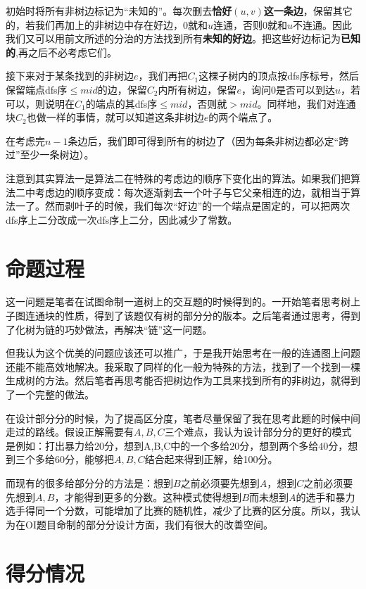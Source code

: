 \documentclass{noithesis}
\begin{document}
初始时将所有非树边标记为“未知的”。每次删去\textbf{恰好$(u, v)$这一条边}，保留其它的，若我们再加上的非树边中存在好边，$0$就和$u$连通，否则$0$就和$u$不连通。因此我们又可以用前文所述的分治的方法找到所有\textbf{未知的好边}。把这些好边标记为\textbf{已知的},再之后不必考虑它们。

接下来对于某条找到的非树边$e$，我们再把$C_1$这棵子树内的顶点按dfs序标号，然后保留端点dfs序$\leq mid$的边，保留$C_2$内所有树边，保留$e$，询问$0$是否可以到达$u$，若可以，则说明在$C_1$的端点的其dfs序$\leq mid$，否则就$> mid$。同样地，我们对连通块$C_2$也做一样的事情，就可以知道这条非树边$e$的两个端点了。

在考虑完$n - 1$条边后，我们即可得到所有的树边了（因为每条非树边都必定“跨过”至少一条树边）。

注意到其实算法一是算法二在特殊的考虑边的顺序下变化出的算法。如果我们把算法二中考虑边的顺序变成：每次逐渐剥去一个叶子与它父亲相连的边，就相当于算法一了。然而剥叶子的时候，我们每次“好边”的一个端点是固定的，可以把两次dfs序上二分改成一次dfs序上二分，因此减少了常数。


\section{命题过程}

这一问题是笔者在试图命制一道树上的交互题的时候得到的。一开始笔者思考树上子图连通块的性质，得到了该题仅有树的部分分的版本。之后笔者通过思考，得到了化树为链的巧妙做法，再解决“链”这一问题。

但我认为这个优美的问题应该还可以推广，于是我开始思考在一般的连通图上问题还能不能高效地解决。我采取了同样的化一般为特殊的方法，找到了一个找到一棵生成树的方法。然后笔者再思考能否把树边作为工具来找到所有的非树边，就得到了一个完整的做法。

在设计部分分的时候，为了提高区分度，笔者尽量保留了我在思考此题的时候中间走过的路线。假设正解需要有$A,B,C$三个难点，我认为设计部分分的更好的模式
是例如：打出暴力给$20$分，想到A,B,C中的一个多给$20$分，想到两个多给$40$分，想到三个多给$60$分，能够把$A,B,C$结合起来得到正解，给100分。


而现有的很多给部分分的方法是：想到$B$之前必须要先想到$A$，想到$C$之前必须要先想到$A,B$，才能得到更多的分数。这种模式使得想到$B$而未想到$A$的选手和暴力选手得同一个分数，可能增加了比赛的随机性，减少了比赛的区分度。所以，我认为在OI题目命制的部分分设计方面，我们有很大的改善空间。


\section{得分情况}
\end{document}
